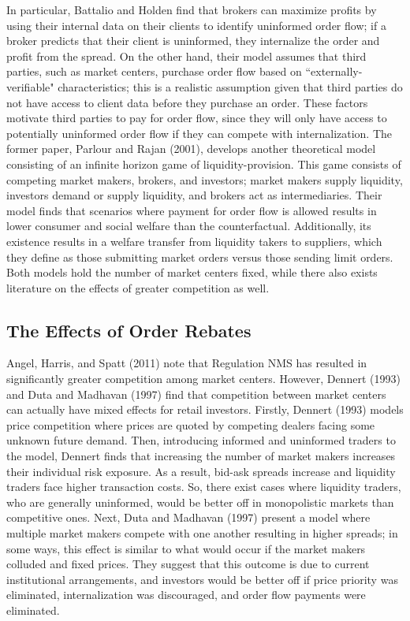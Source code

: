 \documentclass[12pt,a4paper]{article}
\begin{document}
In particular, Battalio and Holden find that brokers can maximize profits by using their internal data on their clients to identify uninformed order flow; if a broker predicts that their client is uninformed, they internalize the order and profit from the spread. On the other hand, their model assumes that third parties, such as market centers, purchase order flow based on ``externally-verifiable" characteristics; this is a realistic assumption given that third parties do not have access to client data before they purchase an order. These factors motivate third parties to pay for order flow, since they will only have access to potentially uninformed order flow if they can compete with internalization. The former paper, Parlour and Rajan (2001), develops another theoretical model consisting of an infinite horizon game of liquidity-provision. This game consists of competing market makers, brokers, and investors; market makers supply liquidity, investors demand or supply liquidity, and brokers act as intermediaries. Their model finds that scenarios where payment for order flow is allowed results in lower consumer and social welfare than the counterfactual. Additionally, its existence results in a welfare transfer from liquidity takers to suppliers, which they define as those submitting market orders versus those sending limit orders. Both models hold the number of market centers fixed, while there also exists literature on the effects of greater competition as well. 

\subsection{The Effects of Order Rebates}

Angel, Harris, and Spatt (2011) note that Regulation NMS has resulted in significantly greater competition among market centers. However, Dennert (1993) and Duta and Madhavan (1997) find that competition between market centers can actually have mixed effects for retail investors. Firstly, Dennert (1993) models price competition where prices are quoted by competing dealers facing some unknown future demand. Then, introducing informed and uninformed traders to the model, Dennert finds that increasing the number of market makers increases their individual risk exposure. As a result, bid-ask spreads increase and liquidity traders face higher transaction costs. So, there exist cases where liquidity traders, who are generally uninformed, would be better off in monopolistic markets than competitive ones. Next, Duta and Madhavan (1997) present a model where multiple market makers compete with one another resulting in higher spreads; in some ways, this effect is similar to what would occur if the market makers colluded and fixed prices. They suggest that this outcome is due to current institutional arrangements, and investors would be better off if price priority was eliminated, internalization was discouraged, and order flow payments were eliminated. 
\end{document}
